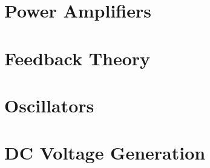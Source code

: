 \chapter{Power Amplifiers}
\chapter{Feedback Theory}
\label{ch:feedback}
\chapter{Oscillators}
\chapter{DC Voltage Generation}